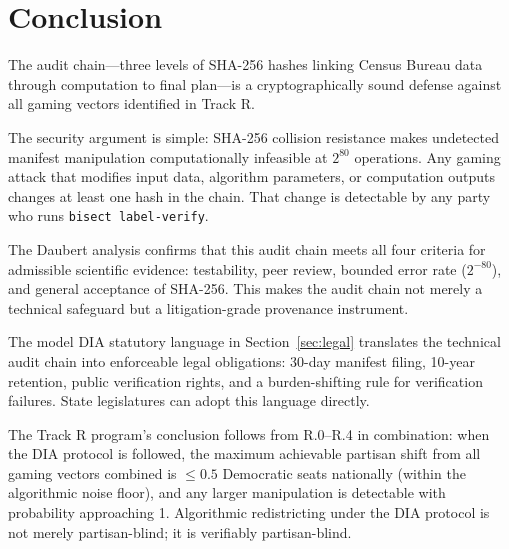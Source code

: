 \section{Conclusion}
\label{sec:conclusion}

The \bisect{} audit chain---three levels of SHA-256 hashes linking
Census Bureau data through computation to final plan---is a cryptographically
sound defense against all gaming vectors identified in Track R.

The security argument is simple: SHA-256 collision resistance makes
undetected manifest manipulation computationally infeasible at $2^{80}$
operations.
Any gaming attack that modifies input data, algorithm parameters, or
computation outputs changes at least one hash in the chain.
That change is detectable by any party who runs \texttt{bisect label-verify}.

The Daubert analysis confirms that this audit chain meets all four criteria
for admissible scientific evidence: testability, peer review, bounded error
rate ($2^{-80}$), and general acceptance of SHA-256.
This makes the audit chain not merely a technical safeguard but a
litigation-grade provenance instrument.

The model DIA statutory language in Section~\ref{sec:legal} translates
the technical audit chain into enforceable legal obligations: 30-day
manifest filing, 10-year retention, public verification rights, and
a burden-shifting rule for verification failures.
State legislatures can adopt this language directly.

The Track R program's conclusion follows from R.0--R.4 in combination:
when the DIA protocol is followed, the maximum achievable partisan shift
from all gaming vectors combined is $\leq 0.5$ Democratic seats nationally
(within the algorithmic noise floor), and any larger manipulation is
detectable with probability approaching 1.
Algorithmic redistricting under the DIA protocol is not merely partisan-blind;
it is verifiably partisan-blind.
